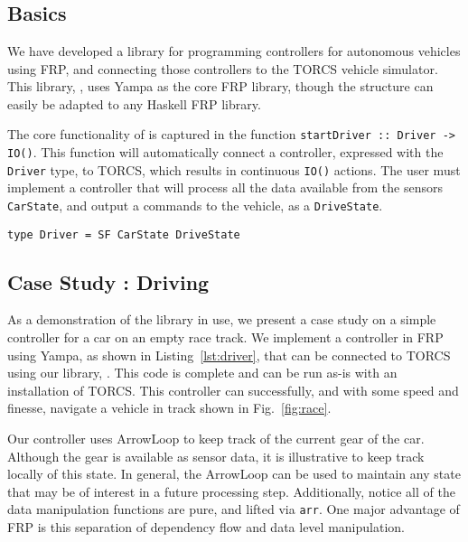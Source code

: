 \section{\ourLib}

\subsection{Basics}

We have developed a library for programming controllers for autonomous vehicles using FRP, and connecting those controllers to the TORCS vehicle simulator.
This library, \ourLib, uses Yampa as the core FRP library, though the structure can easily be adapted to any Haskell FRP library.

The core functionality of \ourLib is captured in the function \texttt{startDriver :: Driver -> IO()}.
This function will automatically connect a controller, expressed with the \texttt{Driver} type, to TORCS, which results in continuous \texttt{IO()} actions.
The user must implement a controller that will process all the data available from the sensors \texttt{CarState}, and output a commands to the vehicle, as a \texttt{DriveState}.

\begin{lstlisting}
type Driver = SF CarState DriveState
\end{lstlisting}

\subsection{Case Study : Driving}

As a demonstration of the \ourLib library in use, we present a case study on a simple controller for a car on an empty race track.
We implement a controller in FRP using Yampa, as shown in Listing~\ref{lst:driver}, that can be connected to TORCS using our library, \ourLib.
This code is complete and can be run as-is with an installation of TORCS.
This controller can successfully, and with some speed and finesse, navigate a vehicle in track shown in Fig.~\ref{fig:race}.

Our controller uses ArrowLoop to keep track of the current gear of the car.
Although the gear is available as sensor data, it is illustrative to keep track locally of this state.
In general, the ArrowLoop can be used to maintain any state that may be of interest in a future processing step.
Additionally, notice all of the data manipulation functions are pure, and lifted via \texttt{arr}.
One major advantage of FRP is this separation of dependency flow and data level manipulation. 

